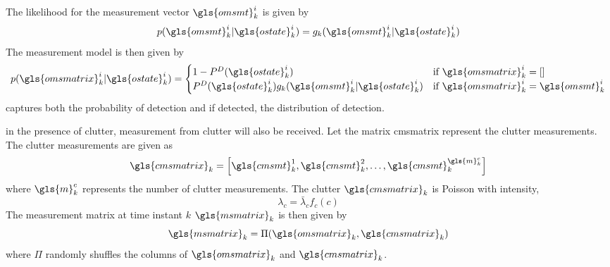 \documentclass[a4paper]{article}
\begin{document}
The likelihood for the measurement vector $\gls{omsmt}_k^i$ is given by
\begin{equation}
	p(\gls{omsmt}_k^i|\gls{ostate}_k^i) = g_k(\gls{omsmt}_k^i|\gls{ostate}_k^i)
\end{equation}
The measurement model is then given by
\begin{equation}
	\label{eq:updmsmodel}
	p(\gls{omsmatrix}_k^i|\gls{ostate}_k^i)=\begin{cases}
		1-P^D(\gls{ostate}_k^i) &\text{if }\gls{omsmatrix}_k^i=[]\\
		P^D(\gls{ostate}_k^i)g_k(\gls{omsmt}_k^i|\gls{ostate}_k^i) &\text{if }\gls{omsmatrix}_k^i=\gls{omsmt}_k^i
	\end{cases}
\end{equation}
 captures both the probability of detection and if detected, the distribution of detection.\par
in the presence of clutter, measurement from clutter will also be received. Let the matrix \gls{cmsmatrix} represent the clutter measurements. The clutter measurements are given as
\begin{equation}
	\gls{cmsmatrix}_k=\left[\gls{cmsmt}_k^1,\gls{cmsmt}_k^2,\dots,\gls{cmsmt}_k^{\gls{m}_k^c}\right]
\end{equation}
where $\gls{m}_k^c$ represents the number of clutter measurements. The clutter $\gls{cmsmatrix}_k$ is Poisson with intensity,
\begin{equation}
	\lambda_c=\bar{\lambda}_cf_c(c)
\end{equation}
The measurement matrix at time instant $k$ $\gls{msmatrix}_k$ is then given by
\begin{equation}
	\gls{msmatrix}_k=\Pi(\gls{omsmatrix}_k,\gls{cmsmatrix}_k)
\end{equation}
where $\Pi$ randomly shuffles the columns of $\gls{omsmatrix}_k$ and $\gls{cmsmatrix}_k$.
\end{document}
